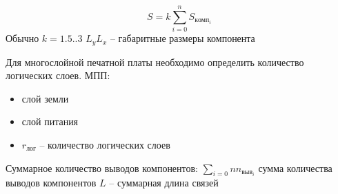 \documentclass{article}
\begin{document}
	$$
	S = k \sum\limits_{i = 0}^{n} S_{комп_i} 
	$$
	Обычно $k = 1.5 .. 3$
	$L_y L_x$ -- габаритные размеры компонента

	Для многослойной печатной платы необходимо определить количество логических слоев.
	МПП:
	\begin{itemize}
		\item слой земли
		\item слой питания
		\item $r_{лог}$ -- количество логических слоев
	\end{itemize}
	Суммарное количество выводов компонентов: $\sum\limits_{i = 0}{n} n_{выв_i}$ сумма количества выводов компонентов $L$ -- суммарная длина связей
\end{document}

